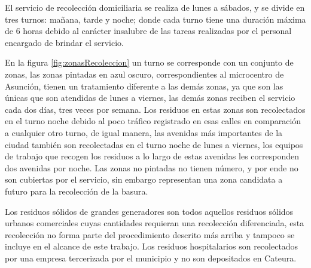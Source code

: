 El servicio de recolección domiciliaria se realiza de lunes a sábados, y se divide en tres turnos: mañana, tarde y noche; donde cada turno tiene una duración máxima de 6 horas debido al carácter insalubre de las tareas realizadas por el personal encargado de brindar el servicio.

En la figura \ref{fig:zonasRecoleccion} un turno se corresponde con un conjunto de zonas, las zonas pintadas en azul oscuro, correspondientes al microcentro de Asunción, tienen un tratamiento diferente a las demás zonas, ya que son las únicas que son atendidas de lunes a viernes, las demás zonas reciben el servicio cada dos días, tres veces por semana. Los residuos en estas zonas son recolectados en el turno noche debido al poco tráfico registrado en esas calles en comparación a cualquier otro turno, de igual manera, las avenidas más importantes de la ciudad también son recolectadas en el turno noche de lunes a viernes, los equipos de trabajo que recogen los residuos a lo largo de estas avenidas les corresponden dos avenidas por noche. Las zonas no pintadas no tienen número, y por ende no son cubiertas por el servicio, sin embargo representan una zona candidata a futuro para la recolección de la basura.

Los residuos sólidos de grandes generadores son todos aquellos residuos sólidos urbanos comerciales cuyas cantidades requieran una recolección diferenciada, esta recolección no forma parte del procedimiento descrito más arriba y tampoco se incluye en el alcance de este trabajo. Los residuos hospitalarios son recolectados por una empresa tercerizada por el municipio y no son depositados en Cateura.

